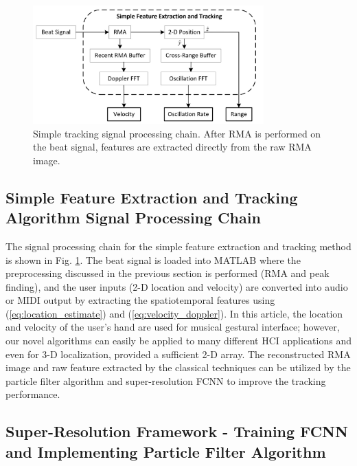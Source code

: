 \documentclass[10pt,journal,final]{IEEEtran}
\begin{document}
\begin{figure}[h]
	\centering
	\includegraphics[width=3.5in]{smith4.jpg}
	\caption{Simple tracking signal processing chain. After RMA is performed on the beat signal, features are extracted directly from the raw RMA image.}
	\label{fig:simple_signal_chain}
\end{figure}

\subsection{Simple Feature Extraction and Tracking Algorithm Signal Processing Chain}
\label{subsec:simple_tracking_implementation}
The signal processing chain for the simple feature extraction and tracking method is shown in Fig. \ref{fig:simple_signal_chain}. 
The beat signal is loaded into MATLAB where the preprocessing discussed in the previous section is performed (RMA and peak finding), and the user inputs (2-D location and velocity) are converted into audio or MIDI output by extracting the spatiotemporal features using (\ref{eq:location_estimate}) and (\ref{eq:velocity_doppler}).
In this article, the location and velocity of the user's hand are used for musical gestural interface; however, our novel algorithms can easily be applied to many different HCI applications and even for 3-D localization, provided a sufficient 2-D array.
The reconstructed RMA image and raw feature extracted by the classical techniques can be utilized by the particle filter algorithm and super-resolution FCNN to improve the tracking performance.

\subsection{Super-Resolution Framework - Training FCNN and Implementing Particle Filter Algorithm}
\label{subsec:enhanced_tracking_implementation}
\end{document}
